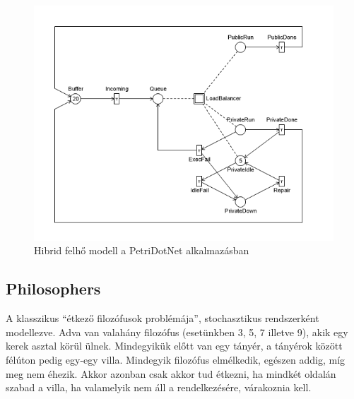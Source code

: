 \begin{figure}
	\centering
	\includegraphics[width=140mm, keepaspectratio]{figures/hybc.png}
	\caption{Hibrid felhő modell a PetriDotNet alkalmazásban}
\end{figure}

\subsection{Philosophers}

A klasszikus ``étkező filozófusok problémája'', stochasztikus rendszerként modellezve.
Adva van valahány filozófus (esetünkben 3, 5, 7 illetve 9), akik egy kerek asztal körül ülnek. Mindegyikük előtt van egy tányér, a tányérok között félúton pedig egy-egy villa. Mindegyik filozófus elmélkedik, egészen addig, míg meg nem éhezik. Akkor azonban csak akkor tud étkezni, ha mindkét oldalán szabad a villa, ha valamelyik nem áll a rendelkezésére, várakoznia kell.

